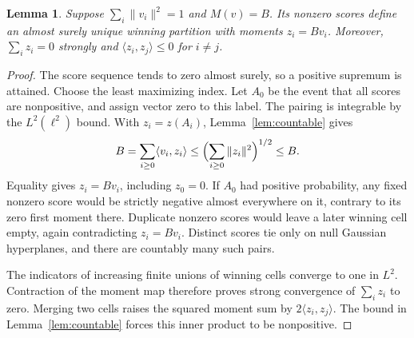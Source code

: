 \documentclass[11pt,reqno]{amsart}
\numberwithin{equation}{section}
\newtheorem{lemma}[theorem]{Lemma}
\theoremstyle{definition}
\theoremstyle{remark}
\begin{document}
\begin{lemma}\label{lem:equalitymoments}
Suppose $\sum_i\|v_i\|^2=1$ and $M(v)=B$. Its nonzero scores define
an almost surely unique winning partition with moments $z_i=Bv_i$.
Moreover, $\sum_i z_i=0$ strongly and
$\langle z_i,z_j\rangle\le0$ for $i\ne j$.
\end{lemma}
\begin{proof}
The score sequence tends to zero almost surely, so a positive
supremum is attained. Choose the least maximizing index. Let $A_0$
be the event that all scores are nonpositive, and assign vector zero
to this label. The pairing is integrable by the $L^2(\ell^2)$ bound.
With $z_i=z(A_i)$, Lemma~\ref{lem:countable} gives
\[
 B=\sum_{i\ge0}\langle v_i,z_i\rangle
       \le\Bigl(\sum_{i\ge0}\|z_i\|^2\Bigr)^{1/2}\le B.
\]
Equality gives $z_i=Bv_i$, including $z_0=0$. If $A_0$ had positive
probability, any fixed nonzero score would be strictly negative
almost everywhere on it, contrary to its zero first moment there.
Duplicate nonzero scores would leave a later winning cell empty,
again contradicting $z_i=Bv_i$. Distinct scores tie only on null
Gaussian hyperplanes, and there are countably many such pairs.

The indicators of increasing finite unions of winning cells converge
to one in $L^2$. Contraction of the moment map therefore proves
strong convergence of $\sum_i z_i$ to zero. Merging two cells raises
the squared moment sum by $2\langle z_i,z_j\rangle$. The bound in
Lemma~\ref{lem:countable} forces this inner product to be nonpositive.
\end{proof}
\end{document}

